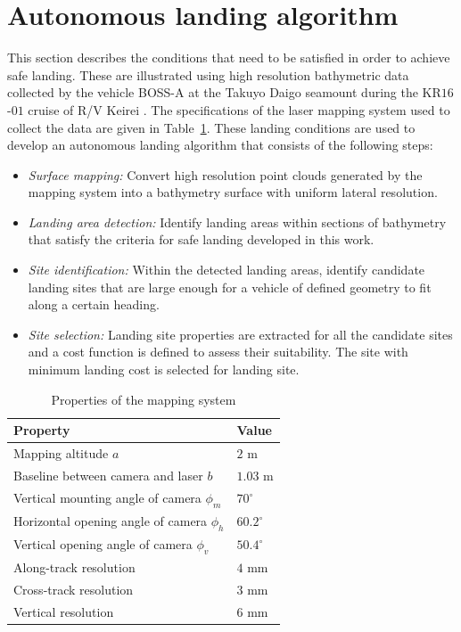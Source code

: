 \section{Autonomous landing algorithm}
\label{sec:algo}

 This section describes the conditions that need to be satisfied in order to achieve safe landing. These are 
 illustrated using high resolution bathymetric data collected by the vehicle BOSS-A at the Takuyo Daigo seamount during the KR$16$-$01$ cruise of R/V Keirei \cite{Thornton2013l,Nishida2016}. The specifications of the laser mapping system used to collect the data are given in Table~\ref{t:table1}. These landing conditions are used to develop an autonomous landing algorithm that consists of the following steps:

\begin{itemize}
  \item \textit{Surface mapping:} Convert high resolution point clouds generated by the mapping system into a bathymetry surface with uniform lateral resolution.
  \item \textit{Landing area detection:} Identify landing areas within sections of bathymetry that satisfy the criteria for safe landing developed in this work.
  \item \textit{Site identification:} Within the detected landing areas, identify candidate landing sites that are large enough for a vehicle of defined geometry to fit along a certain heading. 
  \item \textit{Site selection:} Landing site properties are extracted for all the candidate sites and a cost function is defined to assess their suitability. The site with minimum landing cost is selected for landing site.
\end{itemize}


\begin{table}[!ht]
\centering
\caption{Properties of the mapping system}
\begin{tabular}{  |p{6cm}  p{4cm}| }
\hline
\textbf{Property} & \textbf{Value}\\ \hline 
Mapping altitude $a$ & $2$ m \\
Baseline between camera and laser $b$ & $1.03$ m\\
Vertical mounting angle of camera $\phi_m$ & $70^\circ$ \\
Horizontal opening angle of camera $\phi_h$ & $60.2^{\circ}$\\
Vertical opening angle of camera $\phi_v$ & $50.4^{\circ}$\\
Along-track resolution & $4$ mm\\
Cross-track resolution & $3$ mm\\
Vertical resolution & $6$ mm\\
\hline
\end{tabular}
\label{t:table1}
\end{table}

